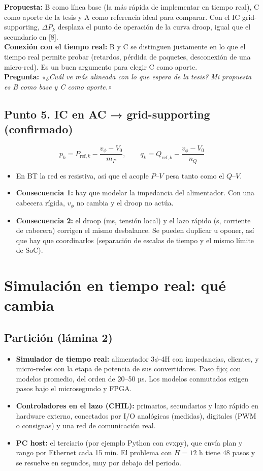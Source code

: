\documentclass[10pt,a4paper]{article}
\begin{document}
\textbf{Propuesta:} B como línea base (la más rápida de implementar en tiempo real), C como aporte de la tesis y A como referencia ideal para comparar. Con el IC grid-supporting, $\Delta P_k$ desplaza el punto de operación de la curva droop, igual que el secundario en [8].\\
\textbf{Conexión con el tiempo real:} B y C se distinguen justamente en lo que el tiempo real permite probar (retardos, pérdida de paquetes, desconexión de una micro-red). Es un buen argumento para elegir C como aporte.\\
\textbf{Pregunta:} \emph{«¿Cuál ve más alineada con lo que espera de la tesis? Mi propuesta es B como base y C como aporte.»}

\subsection*{Punto 5. IC en AC → grid-supporting (confirmado)}
\[
p_k=P_{\mathrm{ref},k}-\frac{v_\phi-V_0}{m_P},\qquad q_k=Q_{\mathrm{ref},k}-\frac{v_\phi-V_0}{n_Q}
\]
\begin{itemize}
  \item En BT la red es resistiva, así que el acople $P$–$V$ pesa tanto como el $Q$–$V$.
  \item \textbf{Consecuencia 1:} hay que modelar la impedancia del alimentador. Con una cabecera rígida, $v_\phi$ no cambia y el droop no actúa.
  \item \textbf{Consecuencia 2:} el droop (ms, tensión local) y el lazo rápido (s, corriente de cabecera) corrigen el mismo desbalance. Se pueden duplicar u oponer, así que hay que coordinarlos (separación de escalas de tiempo y el mismo límite de SoC).
\end{itemize}

\section{Simulación en tiempo real: qué cambia}
\subsection*{Partición (lámina 2)}
\begin{itemize}
  \item \textbf{Simulador de tiempo real:} alimentador 3$\phi$-4H con impedancias, clientes, y micro-redes con la etapa de potencia de sus convertidores. Paso fijo; con modelos promedio, del orden de 20–50 µs. Los modelos conmutados exigen pasos bajo el microsegundo y FPGA.
  \item \textbf{Controladores en el lazo (CHIL):} primarios, secundarios y lazo rápido en hardware externo, conectados por I/O analógicas (medidas), digitales (PWM o consignas) y una red de comunicación real.
  \item \textbf{PC host:} el terciario (por ejemplo Python con cvxpy), que envía plan y rango por Ethernet cada 15 min. El problema con $H=12$ h tiene 48 pasos y se resuelve en segundos, muy por debajo del periodo.
\end{itemize}
\end{document}
